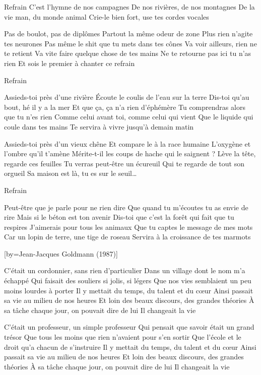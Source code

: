 \beginverse
Refrain
C'est l'hymne de nos campagnes
De nos rivières, de nos montagnes
De la vie man, du monde animal
Crie-le bien fort, use tes cordes vocales \!
\endverse

\beginverse
Pas de boulot, pas de diplômes
Partout la même odeur de zone
Plus rien n'agite tes neurones
Pas même le shit que tu mets dans tes cônes
Va voir ailleurs, rien ne te retient
Va vite faire quelque chose de tes mains
Ne te retourne pas ici tu n'as rien
Et sois le premier à chanter ce refrain
\endverse

\beginverse
Refrain
\endverse

\beginverse
Assieds-toi près d'une rivière
Écoute le coulis de l'eau sur la terre
Dis-toi qu'au bout, hé \! il y a la mer
Et que ça, ça n'a rien d'éphémère
Tu comprendras alors que tu n'es rien
Comme celui avant toi, comme celui qui vient
Que le liquide qui coule dans tes mains
Te servira à vivre jusqu'à demain matin \!
\endverse

\beginverse
Assieds-toi près d'un vieux chêne
Et compare le à la race humaine
L'oxygène et l'ombre qu'il t'amène
Mérite-t-il les coups de hache qui le saignent ?
Lève la tête, regarde ces feuilles
Tu verras peut-être un écureuil
Qui te regarde de tout son orgueil
Sa maison est là, tu es sur le seuil…
\endverse

\beginverse
Refrain
\endverse

\beginverse
Peut-être que je parle pour ne rien dire
Que quand tu m'écoutes tu as envie de rire
Mais si le béton est ton avenir
Dis-toi que c'est la forêt qui fait que tu respires
J'aimerais pour tous les animaux
Que tu captes le message de mes mots
Car un lopin de terre, une tige de roseau
Servira à la croissance de tes marmots \!
\endverse

[by={Jean-Jacques Goldmann (1987)}]

\beginverse
C'était un cordonnier, sans rien d'particulier
Dans un village dont le nom m'a échappé
Qui faisait des souliers si jolis, si légers
Que nos vies semblaient un peu moins lourdes à porter
Il y mettait du temps, du talent et du cœur
Ainsi passait sa vie au milieu de nos heures
Et loin des beaux discours, des grandes théories
À sa tâche chaque jour, on pouvait dire de lui
Il changeait la vie
\endverse

\beginverse
C'était un professeur, un simple professeur
Qui pensait que savoir était un grand trésor
Que tous les moins que rien n'avaient pour s'en sortir
Que l'école et le droit qu'a chacun de s'instruire
Il y mettait du temps, du talent et du cœur
Ainsi passait sa vie au milieu de nos heures
Et loin des beaux discours, des grandes théories
À sa tâche chaque jour, on pouvait dire de lui
Il changeait la vie
\endverse

